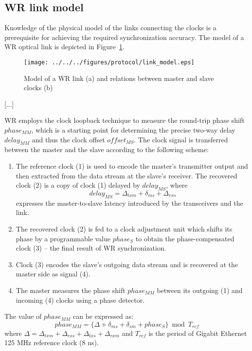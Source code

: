 \def\us{\char`\_}


\subsection{WR link model}
\label{s:link_model}

Knowledge of the physical model of the links connecting the clocks is a
prerequisite for achieving the required synchronization accuracy. The model
of a WR optical link is depicted in Figure~\ref{fig:link_model}.
\begin{figure}[ht!]
  \centering
  \texttt{[image: ../../../figures/protocol/link\_model.eps]}
  \caption{Model of a WR link (a) and relations between master and slave
  clocks (b)}
  \label{fig:link_model}
\end{figure}
[...]

WR employs the clock loopback technique to measure the round-trip phase shift
$phase_{MM}$, which is a starting point for determining the precise two-way
delay $delay_{MM}$ and thus the clock offset $offset_{MS}$. The clock signal is
transferred between the master and the slave according to the following scheme:
\begin{enumerate}
\item The reference clock (1) is used to encode the master's transmitter
output and then extracted from the data stream at the slave's receiver. The
recovered clock (2) is a copy of clock (1) delayed by $delay_{MS}$, where
\begin{equation}
    \label{eq:delayms2}
    delay_{MS} = \Delta_{txm} + \delta_{ms} + \Delta_{rxs}
\end{equation}
expresses the master-to-slave latency introduced by the transceivers and
the link.
\item The recovered clock (2) is fed to a clock adjustment unit which shifts
its phase by a programmable value $phase_{S}$ to obtain the phase-compensated
clock (3) -- the final result of WR synchronization.
\item Clock (3) encodes the slave's outgoing data stream and is recovered
at the master side as signal (4).
\item The master measures the phase shift $phase_{MM}$ between its outgoing
(1) and incoming (4) clocks using a phase detector.
\end{enumerate}
The value of $phase_{MM}$ can be expressed as:
\begin{equation}
    \label{eq:phasemm}
    phase_{MM} = \{\Delta + \delta_{ms} + \delta_{sm} + phase_{S}\} \bmod
    T_{ref}
\end{equation}
where $\Delta = \Delta_{txm} + \Delta_{rxs} + \Delta_{txs} + \Delta_{rxm}$
and $T_{ref}$ is the period of Gigabit Ethernet 125 MHz reference clock (8 ns).

